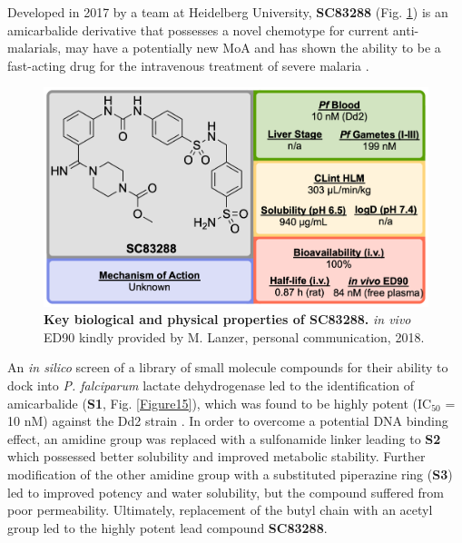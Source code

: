 \documentclass[twocolumn]{bmcart}%
\begin{document}
\hrulefill

Developed in 2017 by a team at Heidelberg University, \textbf{SC83288} (Fig. \ref{Figure14}) is an amicarbalide derivative that possesses a novel chemotype for current anti-malarials, may have a potentially new MoA and has shown the ability to be a fast-acting drug for the intravenous treatment of severe malaria \cite{Pegoraro2017}.

\begin{figure}[h]
	\includegraphics [scale=0.575] {Figure14}
	\caption{{\bf Key biological and physical properties of SC83288.} \textit{in vivo} ED90 kindly provided by M. Lanzer, personal communication, 2018.}
	\label{Figure14}
\end{figure}

An \textit{in silico} screen of a library of small molecule compounds for their ability to dock into \textit{P. falciparum} lactate dehydrogenase led to the identification of amicarbalide (\textbf{S1}, Fig. \ref{Figure15}), which was found to be highly potent (IC$_{50}$ = 10 nM) against the Dd2 strain \cite{Leban2004}. In order to overcome a potential DNA binding effect, an amidine group was replaced with a sulfonamide linker leading to \textbf{S2} which possessed better solubility and improved metabolic stability. Further modification of the other amidine group with a substituted piperazine ring (\textbf{S3}) led to improved potency and water solubility, but the compound suffered from poor permeability. Ultimately, replacement of the butyl chain with an acetyl group led to the highly potent lead compound \textbf{SC83288}.
\end{document}
